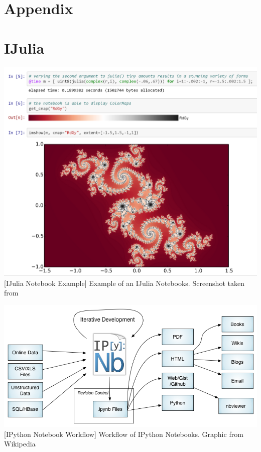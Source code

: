 \setcounter{page}{1}

\begin{appendix}
\section*{Appendix}
{}

\section{IJulia}
\vspace{1em}
\begin{minipage}{\linewidth}
    \centering
    \includegraphics[width=0.9\linewidth]{graphics/ijnotebook.png}
    [IJulia Notebook Example]{
        Example of an IJulia Notebooks.
        Screenshot taken from \cite{IJuliaNotebook}
    }
    \label{fig:ijulianotebook}
\end{minipage}

\vspace{1em}
\begin{minipage}{\linewidth}
    \centering
    \includegraphics[width=0.9\linewidth]{graphics/IPython_Notebook_Workflows.png}
    [IPython Notebook Workflow]{
        Workflow of IPython Notebooks.
        Graphic from Wikipedia \cite{IPyhonNotebookFlow}
    }
    \label{fig:ipythonnotebookflow}
\end{minipage}




\end{appendix}
